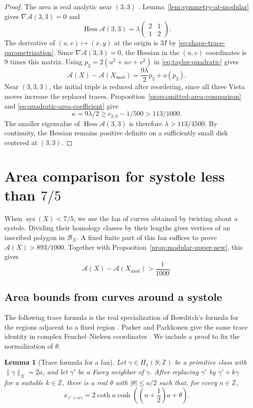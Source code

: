 \documentclass[10pt,twoside]{article}
\theoremstyle{plain}
\newtheorem{lemma}[theorem]{Lemma}
\theoremstyle{definition}
\theoremstyle{remark}
\DeclareMathOperator{\Hess}{Hess}
\DeclareMathOperator{\sys}{sys}
\newcommand{\A}{\mathcal A}
\newcommand{\B}{\mathcal B}
\newcommand{\Z}{\mathbb Z}
\newcommand{\Xmod}{X_{\mathrm{mod}}}
\begin{document}
\begin{proof}
The area is real analytic near $(3,3)$
\cite[Section~3, Corollary~1]{McShaneRivinTori}.
Lemma~\ref{lem:symmetry-at-modular} gives $\nabla\A(3,3)=0$ and
$$
\Hess\A(3,3)=\lambda
\begin{pmatrix}2&1\\1&2\end{pmatrix}.
$$
The derivative of $(u,v)\mapsto(x,y)$ at the origin is $3I$ by
\eqref{eq:shape-trace-parametrization}. Since $\nabla\A(3,3)=0$,
the Hessian in the $(u,v)$ coordinates is $9$ times this matrix.
Using $p_2=2(u^2+uv+v^2)$ in \eqref{eq:taylor-quadratic} gives
$$
\A(X)-\A(\Xmod)=\frac{9\lambda}{2}p_2+o(p_2).
$$
Near $(3,3,3)$, the initial triple is reduced after reordering,
since all three Vieta moves increase the replaced traces.
Proposition~\ref{prop:omitted-area-comparison} and
\eqref{eq:quadratic-area-coefficient} give
$$
\kappa=9\lambda/2\geq c_{2,0}-1/500>113/1000.
$$
The smaller eigenvalue of $\Hess\A(3,3)$ is therefore
$\lambda>113/4500$. By continuity, the Hessian remains positive
definite on a sufficiently small disk centered at $(3,3)$.
\end{proof}

\section{Area comparison for systole less than \texorpdfstring{$7/5$}{7/5}}
\label{sec:short-systole}

When $\sys(X)<7/5$, we use the fan of curves obtained by twisting
about a systole. Dividing their homology classes by their lengths
gives vertices of an inscribed polygon in $\B_X$.
A fixed finite part of this fan suffices to prove $\A(X)>893/1000$.
Together with Proposition~\ref{prop:modular-upper-new}, this gives
$$
\A(X)-\A(\Xmod)>\frac1{1000}.
$$
\subsection{Area bounds from curves around a systole}
\label{sec:global}

The following trace formula is the real specialization of
Bowditch's formula for the regions adjacent to a fixed region
\cite[Section~5, immediately before Lemma~5.4]{Bowditch}.
Parker and Parkkonen give the same trace identity in complex
Fenchel--Nielsen coordinates
\cite[proof of Lemma~4.4, page~469]{ParkerParkkonen1998}.
We include a proof to fix the normalization of $\theta$.

\begin{lemma}[Trace formula for a fan]
\label{lem:balanced-fan}
Let $\gamma\in H_1(S;\Z)$ be a primitive class with $\|\gamma\|_X=2a$,
and let $\gamma'$ be a Farey neighbor of $\gamma$.
After replacing $\gamma'$ by $\gamma'+k\gamma$ for a suitable
$k\in\Z$, there is a real $\theta$ with $|\theta|\leq a/2$ such that,
for every $n\in\Z$,
$$
x_{\gamma'+n\gamma}
=2\coth a\cosh\left(\left(n+\frac12\right)a+\theta\right).
$$
\end{lemma}
\end{document}
